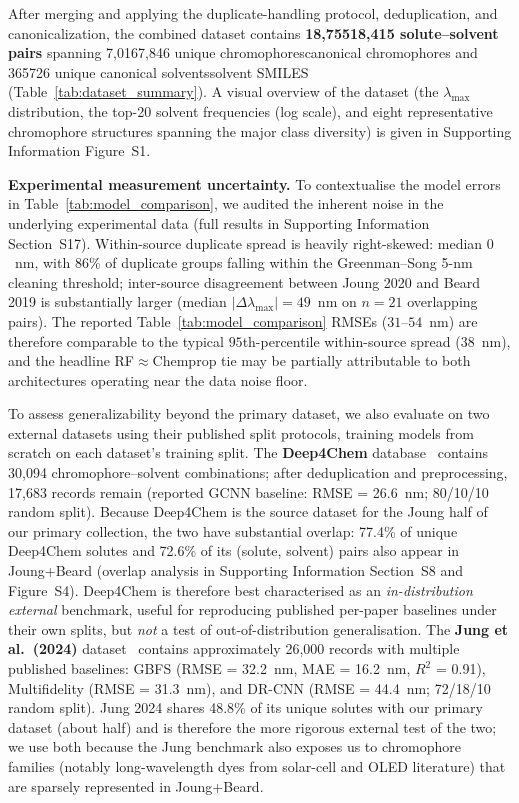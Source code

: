 \documentclass[journal=jcisd8,manuscript=article]{achemso}
\newcommand{\added}[1]{{\color{addedblue}#1}}
\newcommand{\removed}[1]{{\color{removedred}#1}}
\begin{document}
After merging\added{ and applying the duplicate-handling protocol}\removed{, deduplication, and canonicalization}, the combined dataset contains \textbf{\removed{18,755}\added{18,415} solute--solvent pairs} spanning \removed{7,016}\added{7,846} unique \removed{chromophores}\added{canonical chromophores} and \removed{365}\added{726 unique canonical} \removed{solvents}\added{solvent SMILES (Table~\ref{tab:dataset_summary})}.\added{ A visual overview of the dataset (the $\lambda_{\max}$ distribution, the top-20 solvent frequencies (log scale), and eight representative chromophore structures spanning the major class diversity) is given in Supporting Information Figure~S1.}

\added{\textbf{Experimental measurement uncertainty.} To contextualise the model errors in Table~\ref{tab:model_comparison}, we audited the inherent noise in the underlying experimental data (full results in Supporting Information Section~S17). Within-source duplicate spread is heavily right-skewed: median $0$~nm, with $86$\% of duplicate groups falling within the Greenman--Song 5-nm cleaning threshold; inter-source disagreement between Joung 2020 and Beard 2019 is substantially larger (median $|\Delta\lambda_{\max}| = 49$~nm on $n = 21$ overlapping pairs). The reported Table~\ref{tab:model_comparison} RMSEs ($31$--$54$~nm) are therefore comparable to the typical $95$th-percentile within-source spread ($38$~nm), and the headline RF$\approx$Chemprop tie may be partially attributable to both architectures operating near the data noise floor.}

To assess generalizability beyond the primary dataset, we also evaluate on two external datasets using their published split protocols, training models from scratch on each dataset's training split.
The \textbf{Deep4Chem} database~\cite{joung2021deep} contains 30,094 chromophore--solvent combinations; after deduplication and preprocessing, 17,683 records remain (reported GCNN baseline: RMSE = 26.6~nm; 80/10/10 random split). \added{Because Deep4Chem is the source dataset for the Joung half of our primary collection, the two have substantial overlap: 77.4\% of unique Deep4Chem solutes and 72.6\% of its (solute, solvent) pairs also appear in Joung+Beard (overlap analysis in Supporting Information Section~S8 and Figure~S4). Deep4Chem is therefore best characterised as an \emph{in-distribution external} benchmark, useful for reproducing published per-paper baselines under their own splits, but \emph{not} a test of out-of-distribution generalisation.}
The \textbf{Jung et al.\ (2024)} dataset~\cite{jung2024machine} contains approximately 26,000 records with multiple published baselines: GBFS (RMSE = 32.2~nm, MAE = 16.2~nm, $R^2$ = 0.91), Multifidelity (RMSE = 31.3~nm), and DR-CNN (RMSE = 44.4~nm; 72/18/10 random split). \added{Jung 2024 shares 48.8\% of its unique solutes with our primary dataset (about half) and is therefore the more rigorous external test of the two; we use both because the Jung benchmark also exposes us to chromophore families (notably long-wavelength dyes from solar-cell and OLED literature) that are sparsely represented in Joung+Beard.}
\end{document}
